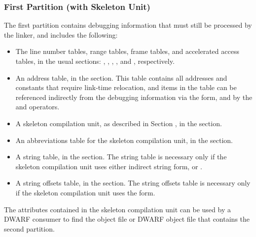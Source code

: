 \subsubsection{First Partition (with Skeleton Unit)}
The first partition contains
debugging information that must still be processed by the linker,
and includes the following:
\begin{itemize}
\item
The line number tables, range tables, frame tables, and
accelerated access tables, in the usual sections:
\dotdebugline, \dotdebuglinestr, \dotdebugranges, \dotdebugframe,
\dotdebugnames{} and \dotdebugaranges,
respectively.
\item
An address table, in the \dotdebugaddr{} section. This table
contains all addresses and constants that require
link-time relocation, and items in the table can be
referenced indirectly from the debugging information via
the \DWFORMaddrx{} form, and by the \DWOPaddrx{} and
\DWOPconstx{} operators.
\item
A skeleton compilation unit, as described in Section
, 
in the \dotdebuginfo{} section.
\item
An abbreviations table for the skeleton compilation unit,
in the \dotdebugabbrev{} section.
\item
A string table, in the \dotdebugstr{} section. The string
table is necessary only if the skeleton compilation unit
uses either indirect string form, \DWFORMstrp{} or
\DWFORMstrx.
\item
A string offsets table, in the \dotdebugstroffsets{}
section. The string offsets table is necessary only if
the skeleton compilation unit uses the \DWFORMstrx{} form.
\end{itemize}
The attributes contained in the skeleton compilation
unit can be used by a DWARF consumer to find the object file
or DWARF object file that contains the second partition.

